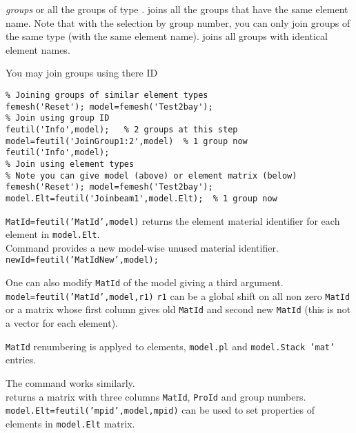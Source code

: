 
 {\sl groups}  or all the groups of type .  joins all the groups that have the same element name. Note that with the selection by group number, you can only join groups of the same type (with the same element name).  joins all groups with identical element names.

You may join groups using there ID

\begin{verbatim}
% Joining groups of similar element types
femesh('Reset'); model=femesh('Test2bay');
% Join using group ID
feutil('Info',model);   % 2 groups at this step
model=feutil('JoinGroup1:2',model)  % 1 group now
feutil('Info',model);
% Join using element types
% Note you can give model (above) or element matrix (below)
femesh('Reset'); model=femesh('Test2bay'); 
model.Elt=feutil('Joinbeam1',model.Elt);  % 1 group now
\end{verbatim}%


{\tt MatId=feutil('MatId',model)} returns the element material identifier for each element in {\tt model.Elt}.\\
Command  provides a new model-wise unused material identifier. {\tt newId=feutil('MatIdNew',model);} \\
\begin{SDT}
One can also modify {\tt MatId} of the model giving a third argument.
{\tt model=feutil('MatId',model,r1)} {\tt r1} can be a global shift on all non zero {\tt MatId} or a matrix whose first column gives old {\tt MatId} and second new {\tt MatId} (this is not a vector for each element).

{\tt MatId} renumbering is applyed to elements, {\tt model.pl} and {\tt model.Stack 'mat'} entries. 
\end{SDT}
The  command works similarly.\\

 returns a matrix with three columns {\tt MatId}, {\tt ProId} and group numbers.\\
{\tt model.Elt=feutil('mpid',model,mpid)} can be used to set properties of elements in {\tt model.Elt} matrix.

